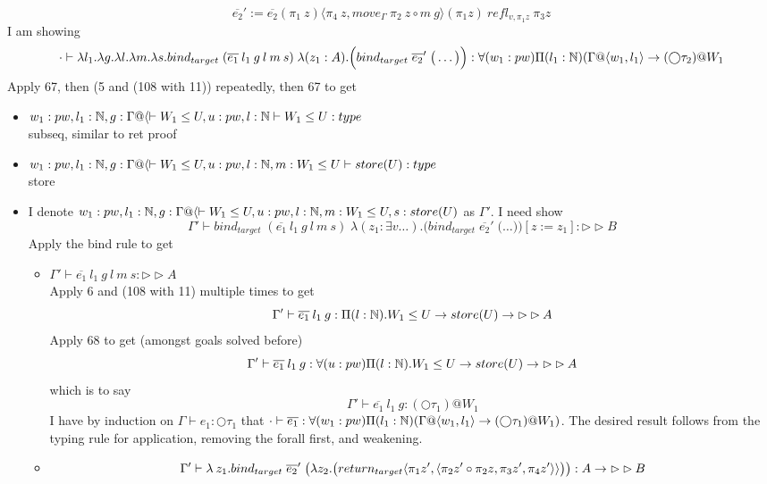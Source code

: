 \documentclass{article}
\begin{document}
\[\overline{e_2}' := \overline{e_2} (\pi_1 \: z)
\langle \pi_4 \: z, move_\Gamma \: \pi_2 \: z \circ m \: g \rangle (\pi_1 z) \: refl_{v, \pi_1 z} \: \pi_3 z
\]
I am showing
\[\cdot \vdash \lambda l_1.  \lambda g. \lambda l. \lambda m . \lambda s. bind_{target}\;(\overline{e_1}\: l_1 \:g \: l \: m \: s) \; \lambda (z_1 : A). \Big( bind_{target} \; \overline{e_2}'
\; 
\big( \dots \big) \Big)
: \forall(w_1: pw)\Pi(l_1: \mathbb{N})(\Gamma @ \langle w_1, l_1 \rangle \rightarrow (\bigcirc \tau_2) @ W_1\]
Apply 67, then (5 and (108 with 11)) repeatedly, then 67 to get
\begin{itemize}
    \item $w_1: pw, l_1 : \N,  g: \Gamma@\langle  \vdash W_1 \leq U, u: pw, l: \N \vdash W_1 \leq U: type$\\
    subseq, similar to ret proof
    \item $w_1: pw, l_1 : \N,  g: \Gamma@\langle  \vdash W_1 \leq U, u: pw, l: \N, m: W_1 \leq U \vdash store(U): type$\\
    store
    \item I denote $w_1: pw, l_1 : \N,  g: \Gamma@\langle  \vdash W_1 \leq U, u: pw, l: \N, m: W_1 \leq U, s: store(U)$ as $\Gamma'$. I need show
    \[\Gamma' \vdash bind_{target}\;(\overline{e_1}\: l_1 \:g \: l \: m \: s) \; \lambda (z_1 : \exists v \dots ).\Big( bind_{target} \; \overline{e_2}'
\; 
\big( \dots \big) \Big) [z:= z_1] : \rhd \rhd B\]
Apply the bind rule to get
\begin{itemize}
    \item $\Gamma' \vdash \overline{e_1}\: l_1 \:g \: l \: m \: s : \rhd \rhd A $\\
    Apply 6 and (108 with 11) multiple times to get
    \[\Gamma' \vdash \overline{e_1} \: l_1 \: g : \Pi(l: \mathbb{N}). W_1 \leq U \rightarrow store(U) \rightarrow \rhd \rhd A\]
    Apply 68 to get (amongst goals solved before)
     \[\Gamma' \vdash \overline{e_1} \: l_1 \: g : \forall(u: pw)\Pi(l: \mathbb{N}). W_1 \leq U \rightarrow store(U) \rightarrow \rhd \rhd A\]
     which is to say
      \[\Gamma' \vdash \overline{e_1} \: l_1 \: g :
      (\bigcirc \tau_1) @ W_1\]
        I have by induction on $\Gamma \vdash e_1 : \bigcirc \tau_1$ that $\cdot \vdash \overline{e_1} : \forall(w_1: pw)\Pi(l_1: \mathbb{N})(\Gamma @ \langle w_1, l_1 \rangle \rightarrow (\bigcirc \tau_1) @ W_1)$. The desired result follows from the typing rule for application, removing the forall first, and weakening.
    \item \[\Gamma' \vdash \lambda \:z_1. bind_{target} \; \overline{e_2}'
\; \big(\lambda z_2. \big(return_{target}\langle \pi_1 z', \langle \pi_2 z' \circ \pi_2 z, \pi_3 z', \pi_4 z' \rangle \rangle \big)\big) : A \rightarrow \rhd \rhd B\]

\end{itemize}
\end{itemize}
\end{document}
